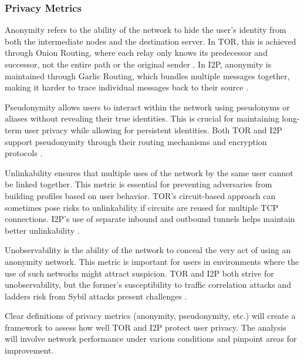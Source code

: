 \documentclass[12pt,conference]{IEEEtran}
\begin{document}
\subsubsection{Privacy Metrics}
Anonymity refers to the ability of the network to hide the user's identity from both the intermediate nodes and the destination server. In TOR, this is achieved through Onion Routing, where each relay only knows its predecessor and successor, not the entire path or the original sender \cite{aSurveyOnTORAndI2P} \cite{torAttacks}. In I2P, anonymity is maintained through Garlic Routing, which bundles multiple messages together, making it harder to trace individual messages back to their source \cite{TORVsI2P}.

Pseudonymity allows users to interact within the network using pseudonyms or aliases without revealing their true identities. This is crucial for maintaining long-term user privacy while allowing for persistent identities. Both TOR and I2P support pseudonymity through their routing mechanisms and encryption protocols \cite{TORVsI2P}.

Unlinkability ensures that multiple uses of the network by the same user cannot be linked together. This metric is essential for preventing adversaries from building profiles based on user behavior. TOR's circuit-based approach can sometimes pose risks to unlinkability if circuits are reused for multiple TCP connections. I2P's use of separate inbound and outbound tunnels helps maintain better unlinkability \cite{aSurveyOnTORAndI2P} \cite{torAttacks}.

Unobservability is the ability of the network to conceal the very act of using an anonymity network. This metric is important for users in environments where the use of such networks might attract suspicion. TOR and I2P both strive for unobservability, but the former's susceptibility to traffic correlation attacks and ladders  risk from Sybil attacks present challenges \cite{TORVsI2P}.

Clear definitions of privacy metrics (anonymity, pseudonymity, etc.) will create a framework to assess how well TOR and I2P protect user privacy. The analysis will involve network performance under various conditions and pinpoint areas for improvement.
\end{document}
